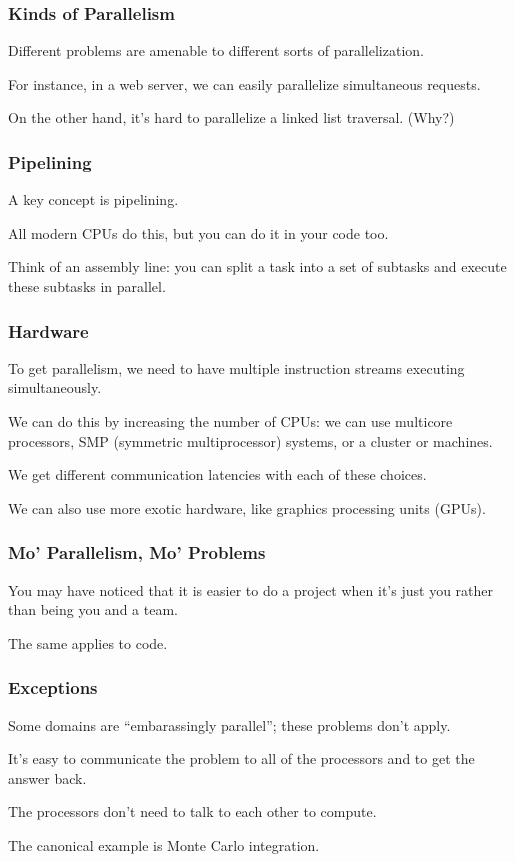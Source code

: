 \begin{frame}
\frametitle{Kinds of Parallelism}
\Large
Different problems are amenable to different sorts of parallelization. 

For instance, in a web server, we
can easily parallelize simultaneous requests. 

On the other hand, it's hard
to parallelize a linked list traversal. (Why?)



\end{frame}



\begin{frame}
\frametitle{Pipelining}
\Large

A key concept is pipelining. 

All modern CPUs do this,
but you can do it in your code too. 

Think of an assembly line: you can split
a task into a set of subtasks and execute these subtasks in parallel.


\end{frame}




\begin{frame}
\frametitle{Hardware}
\Large

To get parallelism, we need to have multiple instruction
streams executing simultaneously. 

We can do this by increasing the
number of CPUs: we can use multicore processors, SMP (symmetric
multiprocessor) systems, or a cluster or machines. 

We get different
communication latencies with each of these choices.

We can also use more exotic hardware, like graphics processing units
(GPUs).

\end{frame}



\begin{frame}
\frametitle{Mo' Parallelism, Mo' Problems}
\Large
You may have noticed that it is easier to do a project when it's just
you rather than being you and a team. 

The same applies to code.

\end{frame}



\begin{frame}
\frametitle{Exceptions}
\Large

Some domains are ``embarassingly parallel''; these problems
don't apply. 

It's easy to communicate the problem to all of the processors and to get the answer back.
 
The processors don't need to talk to each other to compute. 

The canonical
example is Monte Carlo integration.


\end{frame}



